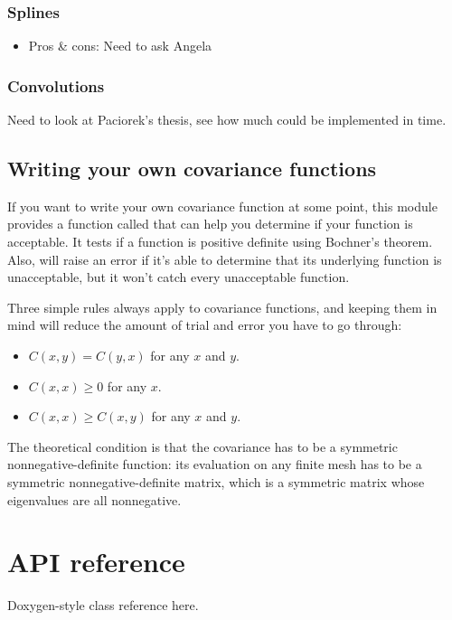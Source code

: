 \documentclass{manual}
\begin{document}
\subsection{Splines}\label{sub:splines}
\begin{itemize}
	\item Pros \& cons: Need to ask Angela
\end{itemize}

\subsection{Convolutions}\label{sub:convolutions}
Need to look at Paciorek's thesis, see how much could be implemented in time.


\section{Writing your own covariance functions}\label{sec:usercov} %
If you want to write your own covariance function at some point, this module provides a function called  that can help you determine if your function is acceptable. It tests if a function is positive definite using Bochner's theorem. Also,  will raise an error if it's able to determine that its underlying function is unacceptable, but it won't catch every unacceptable function. 

Three simple rules always apply to covariance functions, and keeping them in mind will reduce the amount of trial and error you have to go through:
\begin{itemize}
	\item $C(x,y)=C(y,x)$ for any $x$ and $y$.
	\item $C(x,x) \ge 0$ for any $x$.
	\item $C(x,x)\ge C(x,y)$ for any $x$ and $y$.
\end{itemize}

The theoretical condition is that the covariance has to be a symmetric nonnegative-definite function: its evaluation on any finite mesh has to be a symmetric nonnegative-definite matrix, which is a symmetric matrix whose eigenvalues are all nonnegative.


\chapter{API reference}\label{cha:reference} 

Doxygen-style class reference here.
\end{document}
